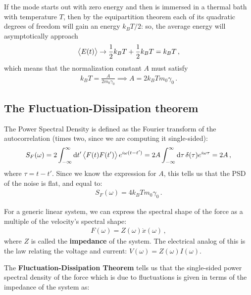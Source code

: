 \documentclass[main.tex]{subfiles}
\begin{document}
If the mode starts out with zero energy and then is immersed in a thermal bath with temperature \(T\), then by the equipartition theorem each of its quadratic degrees of freedom will gain an energy \(k_B T /2\): so, the average energy will asymptotically approach
%
\begin{align}
\expval{E(t)} \to \frac{1}{2} k_B T + \frac{1}{2} k_B T = k_B T 
\,,
\end{align}
%
which means that the normalization constant \(A\) must satisfy 
%
\begin{align}
k_B T = \frac{A}{2 m_0 \gamma_0 } \implies A = 2 k_B T m_0 \gamma_0 
\,.
\end{align}
%

\subsection{The Fluctuation-Dissipation theorem}

The Power Spectral Density is defined as the Fourier transform of the autocorrelation (times two, since we are computing it single-sided): 
%
\begin{align}
S_F(\omega ) = 2 \int_{-\infty}^{\infty} \dd{t'} \expval{F(t) F(t')} e^{i \omega (t - t')} = 2 A \int_{-\infty}^{\infty} \dd{\tau } \delta(\tau ) e^{i \omega \tau } = 2A 
\,,
\end{align}
%
where \(\tau  = t - t'\). Since we know the expression for \(A\), this tells us that the PSD of the noise is flat, and equal to: 
%
\begin{align}
S_F(\omega ) = 4 k_B T m_0 \gamma_0 
\,.
\end{align}

For a generic linear system, we can express the spectral shape of the force as a multiple of the velocity's spectral shape: 
%
\begin{align}
F(\omega ) = Z(\omega ) \dot{x}(\omega )
\,,
\end{align}
%
where \(Z\) is called the \textbf{impedance} of the system. The electrical analog of this is the law relating the voltage and current: \(V(\omega ) = Z(\omega ) I(\omega )\).

The \textbf{Fluctuation-Dissipation Theorem} tells us that the single-sided power spectral density of the force which is due to fluctuations is given in terms of the impedance of the system as:
%
\end{document}

